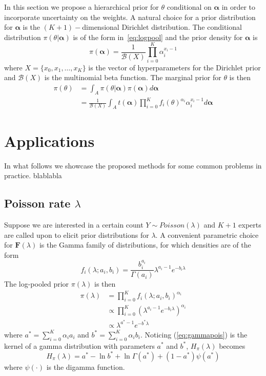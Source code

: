 \documentclass[a4paper, notitlepage, 10pt]{article}
\begin{document}
In this section we propose a hierarchical prior for $\theta$ conditional on $\boldsymbol\alpha$ in order to incorporate uncertainty on the weights.
A natural choice for a prior distribution for $\boldsymbol\alpha$ is the $(K+1)-$dimensional Dirichlet distribution.
The conditional distribution $\pi(\theta|\boldsymbol\alpha)$ is of the form in~\ref{eq:logpool} and the prior density for $\boldsymbol\alpha$ is 
\begin{equation}
 \label{eq:generalcondprior}
 \pi(\boldsymbol\alpha) = \frac{1}{\mathcal{B}(X)}\prod_{i=0}^K \alpha_i^{x_i-1}
\end{equation}
where $X = \{ x_0, x_1, \ldots, x_K\}$ is the vector of hyperparameters for the Dirichlet prior and $\mathcal{B}(X)$ is the multinomial beta function.
The marginal prior for $\theta$ is then
\begin{align}
 \label{eq:marginalhierprior}
 \pi(\theta) &= \int_{A}\pi(\theta|\boldsymbol\alpha)\pi(\boldsymbol\alpha)d\boldsymbol\alpha \\
             &= \frac{1}{\mathcal{B}(X)}\int_{A}t(\boldsymbol\alpha)\prod_{i=0}^K f_i(\theta)^{\alpha_i}\alpha_i^{x_i-1}d\boldsymbol\alpha 
\end{align}

\section*{Applications}
In what follows we showcase the proposed methods for some common problems in practice.
blablabla

\subsection*{Poisson rate $\lambda$}
Suppose we are interested in a certain count $Y\sim Poisson(\lambda)$ and $K + 1$ experts are called upon to elicit prior distributions for $\lambda$.
A convenient parametric choice for $\mathbf{F}(\lambda)$ is the Gamma family of distributions, for which densities are of the form
$$ f_i(\lambda;a_i,b_i) = \frac{b_i^{a_i}}{\Gamma(a_i)} \lambda^{a_i-1} e^{-b_i\lambda}$$
The log-pooled prior $\pi(\lambda)$ is then
\begin{align}
\pi(\lambda)&=\prod_{i=0}^{K}f_i(\lambda;a_i,b_i)^{\alpha_i}\\
&\propto \prod_{i=0}^{K} \left(\lambda^{a_i-1} e^{-b_i\lambda}\right)^{\alpha_i}\\
\label{eq:gammapois}
&\propto \lambda^{a^*-1} e^{-b^*\lambda}
\end{align}
where $a^* =\sum_{i=0}^{K}\alpha_ia_i$ and $b^* = \sum_{i=0}^{K}\alpha_ib_i$.
Noticing (\ref{eq:gammapois}) is the kernel of a gamma distribution with parameters $a^*$ and $b^*$, $H_{\pi}(\lambda)$ becomes
\begin{equation}
\label{eq:entropygamma}
H_{\pi}(\lambda) = a^* - \ln b^* + \ln \Gamma(a^*) + (1-a^*)\psi(a^*)
\end{equation}
where $\psi(\cdot)$ is the digamma function.
\end{document}
